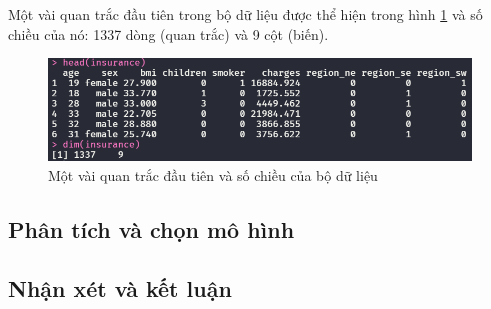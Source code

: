 Một vài quan trắc đầu tiên trong bộ dữ liệu được thể hiện trong hình \ref{fig-a1:head-dataset} và số chiều của nó: 1337 dòng (quan trắc) và 9 cột (biến).
\begin{figure}[H]
	\centering
	\includegraphics[width=0.8\linewidth]{images/A1/head-dataset}
	\caption{Một vài quan trắc đầu tiên và số chiều của bộ dữ liệu}
	\label{fig-a1:head-dataset}
\end{figure}

\subsection*{Phân tích và chọn mô hình}

\subsection*{Nhận xét và kết luận}